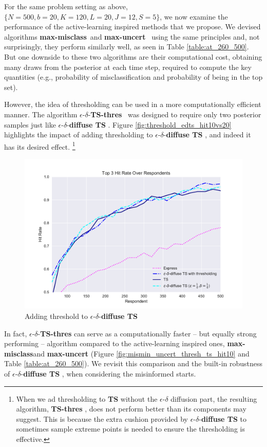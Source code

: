 \documentclass[nonblindrev]{informs3}
\newcommand{\mismin}{\textbf{max-misclass}}
\newcommand{\ts}{\textbf{TS} }
\newcommand{\edts}{$\epsilon$-$\delta$-\textbf{diffuse TS} }
\newcommand{\tsthres}{\textbf{TS-thres} }
\newcommand{\edtsthres}{$\epsilon$-$\delta$-\textbf{TS-thres} }
\newcommand{\uncert}{\textbf{max-uncert} }
\newcommand{\numperset}{L}
\begin{document}
For the same problem setting as above, $\{N=500,b=20,K=120,\numperset=20,J=12,S=5\}$, we now examine the performance of the active-learning inspired methods that we propose. We devised algorithms \mismin\ and \uncert\ using the same principles and, not surprisingly, they perform similarly well, as seen in Table \ref{table:at_260_500}. But one downside to these two algorithms are their computational cost, obtaining many draws from the posterior at each time step, required to compute the key quantities (e.g., probability of misclassification and probability of being in the top set). 

However, the idea of thresholding can be used in a more computationally efficient manner. The algorithm \edtsthres\ was designed to require only two posterior samples just like \edts.  Figure \ref{fig:threshold_edts_hit10vs20} highlights the impact of adding thresholding to \edts, and indeed it has its desired effect.
\footnote{When we ad thresholding to \ts without the $\epsilon$-$\delta$ diffusion part, the resulting algorithm, \tsthres, does not perform better than its components may suggest. This is because the extra cushion provided by \edts to sometimes sample extreme points is needed to ensure the thresholding is effective.}

\begin{figure}%
    \caption{Adding threshold to \edts}%
    \label{fig:K120_L20_k3hit_k10hit}%
	\begin{center}
	\includegraphics[width=.8\textwidth]{plots/hr120v20k3TS.pdf} 
	\end{center}
\end{figure}

In fact, \edtsthres can serve as a computationally faster -- but equally strong performing -- algorithm compared to the active-learning inspired ones, \mismin and \uncert (Figure \ref{fig:mismin_uncert_thresh_ts_hit10} and Table \ref{table:at_260_500}). We revisit this comparison and the built-in robustness of \edts, when considering the misinformed starts. 
\end{document}
